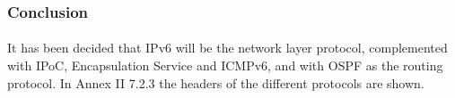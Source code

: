 \subsubsection{Conclusion}
\paragraph{}It has been decided that IPv6 will be the network layer protocol, complemented with IPoC, Encapsulation Service and ICMPv6, and with OSPF as the routing protocol. In Annex II 7.2.3 the headers of the different protocols are shown. 
